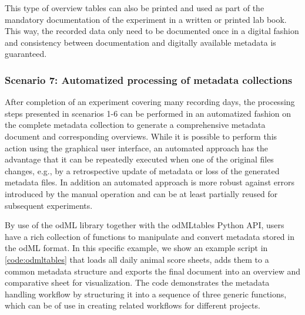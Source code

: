 {This type of overview tables can also be printed and used as part of the mandatory documentation of the experiment in a written or printed lab book. This way, the recorded data only need to be documented once in a digital fashion and consistency between documentation and digitally available metadata is guaranteed. 

\subsubsection*{Scenario 7: Automatized processing of metadata collections}
After completion of an experiment covering many recording days, the processing steps presented in scenarios 1-6 can be performed in an automatized fashion on the complete metadata collection to generate a comprehensive metadata document and corresponding overviews. While it is possible to perform this action using the graphical user interface, an automated approach has the advantage that it can be repeatedly executed when one of the original files changes, e.g., by a retrospective update of metadata or loss of the generated metadata files. In addition an automated approach is more robust against errors introduced by the manual operation and can be at least partially reused for subsequent experiments.

By use of the odML library together with the odMLtables Python API, users have a rich collection of functions to manipulate and convert metadata stored in the odML format. In this specific example, we show an example script in \cref{code:odmltables} that loads all daily animal score sheets, adds them to a common metadata structure and exports the final document into an overview and comparative  sheet for visualization. The code demonstrates the metadata handling workflow by structuring it into a sequence of three generic functions, which can be of use in creating related workflows for different projects.





}
